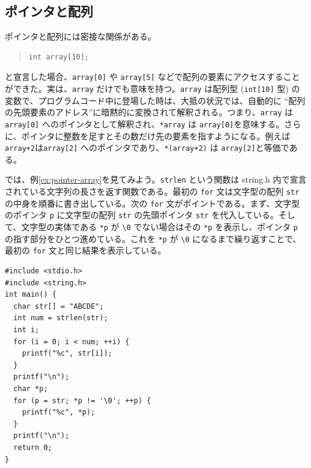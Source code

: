 \subsection{ポインタと配列}
\label{sec:C:pointer-array}
ポインタと配列には密接な関係がある。
%
\begin{quote}
\begin{verbatim}
int array[10];
\end{verbatim}
\end{quote}
%
と宣言した場合、\verb|array[0]| や \verb|array[5]| などで配列の要素にアクセスすることができた。実は、\verb|array| だけでも意味を持つ。\verb|array| は配列型 (\verb|int[10]| 型) の変数で、プログラムコード中に登場した時は、大抵の状況では、自動的に ``配列の先頭要素のアドレス''に暗黙的に変換されて解釈される。つまり、\verb|array| は \verb|array[0]| へのポインタとして解釈され、\verb|*array| は \verb|array[0]|を意味する。さらに、ポインタに整数を足すとその数だけ先の要素を指すようになる。例えば\verb|array+2|は\verb|array[2]| へのポインタであり、\verb|*(array+2)| は \verb|array[2]|と等価である。

では、例\ref{ex:pointer-array}を見てみよう。\verb|strlen| という関数は string.h 内で宣言されている文字列の長さを返す関数である。最初の \verb|for| 文は文字型の配列 \verb|str| の中身を順番に書き出している。次の \verb|for| 文がポイントである。まず、文字型のポインタ \verb|p| に文字型の配列 \verb|str| の先頭ポインタ \verb|str| を代入している。そして、文字型の実体である \verb|*p| が \verb|\0| でない場合はその \verb|*p| を表示し、ポインタ \verb|p| の指す部分をひとつ進めている。これを \verb|*p| が \verb|\0| になるまで繰り返すことで、最初の \verb|for| 文と同じ結果を表示している。
%
\begin{reidai}\label{ex:pointer-array}
\begin{verbatim}
#include <stdio.h>
#include <string.h>
int main() {
  char str[] = "ABCDE";
  int num = strlen(str);
  int i;
  for (i = 0; i < num; ++i) {
    printf("%c", str[i]);
  }
  printf("\n");
  char *p;
  for (p = str; *p != '\0'; ++p) {
    printf("%c", *p);
  }
  printf("\n");
  return 0;
}
\end{verbatim}
\end{reidai}
%


